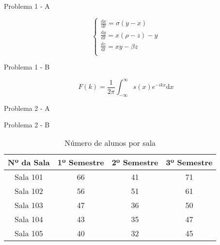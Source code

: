 \documentclass[
12pt, %
a4paper, %
brazil, %
oneside, %
]{abntex2}
\begin{document}
\centering Problema 1 - A

\begin{equation}
\begin{cases}
	\frac{\mathrm{d}x}{\mathrm{d}t}=\sigma(y-x) \\
	\frac{\mathrm{d}y}{\mathrm{d}t}=x(\rho-z)-y \\
	\frac{\mathrm{d}z}{\mathrm{d}t}=xy-\beta z \\
\end{cases}
\end{equation}

\vspace{0,5cm}

\centering Problema 1 - B

\begin{equation}
F(k)=\frac{1}{2\pi}\int_{-\infty}^{\infty} s(x)e^{-ikx}\mathrm{d}x
\end{equation}

\vspace{0,5cm}

\centering Problema 2 - A

\begin{table}[htb]


\end{table}

\vspace{0,5cm}

\newpage

\centering Problema 2 - B

\begin{table}[htb]

\caption{Número de alunos por sala}
\label{Tabela 2}

\centering\begin{tabular}{cccc}
		\toprule
		Nº da Sala & 1º Semestre & 2º Semestre & 3º Semestre \\
		\midrule
		Sala 101 & 66 & 41 & 71 \\
		\midrule
		Sala 102 & 56 & 51 & 61 \\
		\midrule
		Sala 103 & 47 & 36 & 50 \\
		\midrule
		Sala 104 & 43 & 35 & 47 \\
		\midrule
		Sala 105 & 40 & 32 & 45 \\
		\bottomrule
	\end{tabular}
\end{table}
\end{document}
